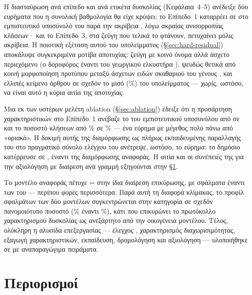 Η διασταύρωση ανά επίπεδο και ανά ετικέτα δυσκολίας (Κεφάλαια~4--5) ανέδειξε
δύο ευρήματα που η συνολική βαθμολογία θα είχε κρύψει: το Επίπεδο~1 καταρρέει σε
 \TierOneFone{} στο εμπιστευτικό υποσύνολό του παρά την ακρίβεια \CascadeValAuc, λόγω
ακραίας ανισορροπίας κλάσεων· και το Επίπεδο~3, στα \TierThreeCount{} ζεύγη που τελικά το φτάνουν,
πετυχαίνει μόλις \TierThreeAcc{} ακρίβεια.
Η ποιοτική εξέταση αυτού του υπολείμματος
(\S\ref{sec:hard-residual}) αποκάλυψε συγκεκριμένα μοτίβα αποτυχίας: ζεύγη με κοινό
όνομα αλλά άσχετο περιεχόμενο (ο δορυφόρος  έναντι του γεωργικού
ελκυστήρα ), ψευδώς θετικά από κοινή μορφοποίηση προτύπου
 μεταξύ άσχετων ειδών σκαθαριού του γένους , και ελλιπές
κείμενο άρθρου σε σχεδόν το μισό (\HardResMissingPct\%) του υπολείμματος --- χωρίς, ωστόσο, να είναι
αυτό η κύρια αιτία της αποτυχίας.

Μια εκ των υστέρων μελέτη ablation
(\S\ref{sec:ablation}) έδειξε ότι η προσάρτηση χαρακτηριστικών  στο
Επίπεδο~1 ανέβαζε το  του εμπιστευτικού υποσυνόλου από \TierOneFone{} σε
\NTwoVWithConfFone{} και το ποσοστό κλήσεων από \TierOnePct\% σε \NTwoVWithCallPct\% --- ένα εύρημα με μέγεθος
πολύ πάνω από «οριακό».
Η δοκιμή αυτής της διαμόρφωσης ως πλήρως εκπαιδευμένης
παραλλαγής του  στο πραγματικό σύνολο ελέγχου του 
ανέτρεψε, ωστόσο, το εύρημα: το δημόσιο  κατέρρευσε σε \NTwoVKagglePublic, έναντι
\KaggleBaselinePublic της διαμόρφωσης αναφοράς.
Η αιτία και οι συνέπειές της για την
αξιολόγηση με διαίρεση ανά γραμμή εξηγούνται στην \S\ref{sec:limitations-cost}.

Το μοντέλο αναφοράς  πέτυχε  = \SvmFone στην ίδια
διαίρεση επικύρωσης, με \SvmTotalErrors{} σφάλματα έναντι των \CascadeTotalErrors{} του  --- περίπου
\CascadeVsSvmRatio{} φορές περισσότερα.
Παρά αυτή τη διαφορά κλίμακας, το προφίλ σφαλμάτων των δύο
μοντέλων συγκεντρώνεται στην κατηγορία  σε σχεδόν πανομοιότυπο ποσοστό
(\SvmErrorsHardPct\% έναντι \CascadeErrorsHardPct\%), κάτι που επικυρώνει το πρωτόκολλο χαρακτηρισμού
δυσκολίας ως ανεξάρτητο από την οικογένεια μοντέλου.
Τέλος, ολόκληρη η αλυσίδα
επεξεργασίας --- έλεγχος , χαρακτηρισμός διαχωρισιμότητας, εξαγωγή
χαρακτηριστικών, εκπαίδευση, δρομολόγηση και αξιολόγηση --- υλοποιήθηκε σε 
με αναπαραγώγιμα πειράματα.


\section{Περιορισμοί}
\label{sec:limitations-cost}

